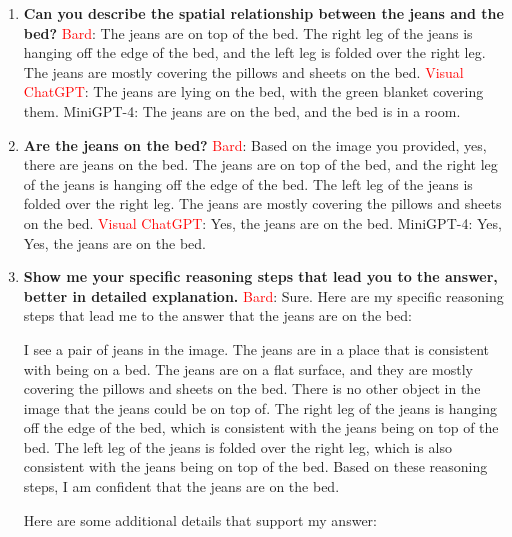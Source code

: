 \begin{enumerate}
    \item \textbf{Can you describe the spatial relationship between the jeans and the bed?}
    \subitem \textcolor{Red}{Bard}: 
    The jeans are on top of the bed. The right leg of the jeans is hanging off the edge of the bed, and the left leg is folded over the right leg. The jeans are mostly covering the pillows and sheets on the bed.
    \subitem \textcolor{red}{Visual ChatGPT}: The jeans are lying on the bed, with the green blanket covering them.
    \subitem MiniGPT-4: The jeans are on the bed, and the bed is in a room.
    \item \textbf{Are the jeans on the bed?}
    \subitem \textcolor{Red}{Bard}: 
    Based on the image you provided, yes, there are jeans on the bed. The jeans are on top of the bed, and the right leg of the jeans is hanging off the edge of the bed. The left leg of the jeans is folded over the right leg. The jeans are mostly covering the pillows and sheets on the bed.
    \subitem \textcolor{red}{Visual ChatGPT}: Yes, the jeans are on the bed.
    \subitem MiniGPT-4: Yes, Yes, the jeans are on the bed.
    \item \textbf{Show me your specific reasoning steps that lead you to the answer, better in detailed explanation.}
    \subitem \textcolor{Red}{Bard}: 
    Sure. Here are my specific reasoning steps that lead me to the answer that the jeans are on the bed:
    
    I see a pair of jeans in the image.
    The jeans are in a place that is consistent with being on a bed. The jeans are on a flat surface, and they are mostly covering the pillows and sheets on the bed.
    There is no other object in the image that the jeans could be on top of.
    The right leg of the jeans is hanging off the edge of the bed, which is consistent with the jeans being on top of the bed.
    The left leg of the jeans is folded over the right leg, which is also consistent with the jeans being on top of the bed.
    Based on these reasoning steps, I am confident that the jeans are on the bed.
    
    Here are some additional details that support my answer:
    

\end{enumerate}
